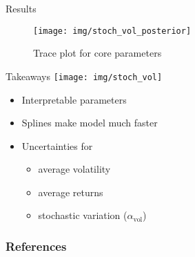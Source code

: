 \documentclass{beamer}
\begin{document}
\begin{frame}{Results}
    \begin{figure}
        \centering
        \texttt{[image: img/stoch\_vol\_posterior]}
        \caption{Trace plot for core parameters}
    \end{figure}
\end{frame}
\begin{frame}{Takeaways}
    \texttt{[image: img/stoch\_vol]}
    \begin{itemize}
        \item Interpretable parameters
        \item Splines make model much faster
        \item Uncertainties for
        \begin{itemize}
            \item average volatility
            \item average returns 
            \item stochastic variation ($\alpha_{\text{vol}}$)
        \end{itemize}
    \end{itemize}
\end{frame}
\begin{frame}[allowframebreaks]
\frametitle{References}


\end{frame}
\end{document}
